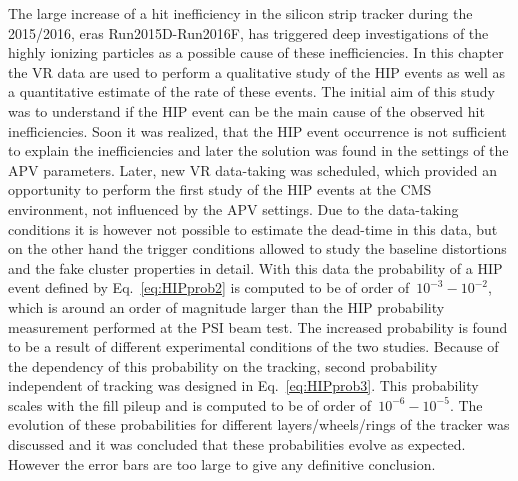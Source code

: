 The large increase of a hit inefficiency in the silicon strip tracker during the 2015/2016, eras Run2015D-Run2016F, has triggered deep investigations of the highly ionizing particles as a possible cause of these inefficiencies. In this chapter the VR data are used to perform a qualitative study of the HIP events as well as a quantitative estimate of the rate of these events. The initial aim of this study was to understand if the HIP event can be the main cause of the observed hit inefficiencies. Soon it was realized, that the HIP event occurrence is not sufficient to explain the inefficiencies and later the solution was found in the settings of the APV parameters. Later, new VR data-taking was scheduled, which provided an opportunity to perform the first study of the HIP events at the CMS environment, not influenced by the APV settings. Due to the data-taking conditions it is however not possible to estimate the dead-time in this data, but on the other hand the trigger conditions allowed to study the baseline distortions and the fake cluster properties in detail. With this data the probability of a HIP event defined by Eq.~\ref{eq:HIPprob2} is computed to be of order of~$10^{-3}-10^{-2}$, which is around an order of magnitude larger than the HIP probability measurement performed at the PSI beam test. The increased probability is found to be a result of different experimental conditions of the two studies. Because of the dependency of this probability on the tracking, second probability independent of tracking was designed in Eq.~\ref{eq:HIPprob3}. This probability scales with the fill pileup and is computed to be of order of~$10^{-6}-10^{-5}$. The evolution of these probabilities for different layers/wheels/rings of the tracker was discussed and it was concluded that these probabilities evolve as expected. However the error bars are too large to give any definitive conclusion.

\newpage

